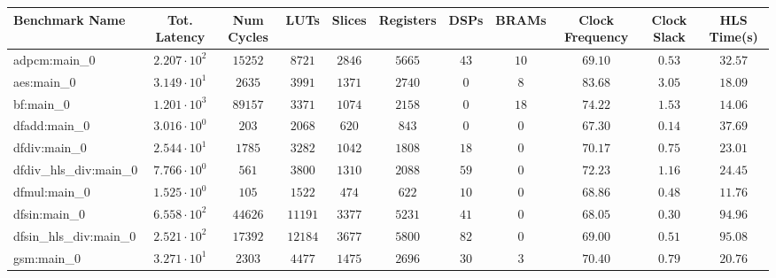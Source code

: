 \begin{tabular}{|l|c|c|c|c|c|c|c|c|c|c|}
\hline
Benchmark Name          & Tot. Latency           & Num Cycles & LUTs      & Slices    & Registers & DSPs    & BRAMs   & Clock Frequency & Clock Slack & HLS Time(s) \\
\hline
adpcm:main\_0           & $ 2.207 \cdot 10^{2} $ & $ 15252  $ & $ 8721  $ & $ 2846  $ & $ 5665  $ & $ 43  $ & $ 10  $ & $ 69.10       $ & $ 0.53    $ & $ 32.57   $ \\
aes:main\_0             & $ 3.149 \cdot 10^{1} $ & $ 2635   $ & $ 3991  $ & $ 1371  $ & $ 2740  $ & $ 0   $ & $ 8   $ & $ 83.68       $ & $ 3.05    $ & $ 18.09   $ \\
bf:main\_0              & $ 1.201 \cdot 10^{3} $ & $ 89157  $ & $ 3371  $ & $ 1074  $ & $ 2158  $ & $ 0   $ & $ 18  $ & $ 74.22       $ & $ 1.53    $ & $ 14.06   $ \\
dfadd:main\_0           & $ 3.016 \cdot 10^{0} $ & $ 203    $ & $ 2068  $ & $ 620   $ & $ 843   $ & $ 0   $ & $ 0   $ & $ 67.30       $ & $ 0.14    $ & $ 37.69   $ \\
dfdiv:main\_0           & $ 2.544 \cdot 10^{1} $ & $ 1785   $ & $ 3282  $ & $ 1042  $ & $ 1808  $ & $ 18  $ & $ 0   $ & $ 70.17       $ & $ 0.75    $ & $ 23.01   $ \\
dfdiv\_hls\_div:main\_0 & $ 7.766 \cdot 10^{0} $ & $ 561    $ & $ 3800  $ & $ 1310  $ & $ 2088  $ & $ 59  $ & $ 0   $ & $ 72.23       $ & $ 1.16    $ & $ 24.45   $ \\
dfmul:main\_0           & $ 1.525 \cdot 10^{0} $ & $ 105    $ & $ 1522  $ & $ 474   $ & $ 622   $ & $ 10  $ & $ 0   $ & $ 68.86       $ & $ 0.48    $ & $ 11.76   $ \\
dfsin:main\_0           & $ 6.558 \cdot 10^{2} $ & $ 44626  $ & $ 11191 $ & $ 3377  $ & $ 5231  $ & $ 41  $ & $ 0   $ & $ 68.05       $ & $ 0.30    $ & $ 94.96   $ \\
dfsin\_hls\_div:main\_0 & $ 2.521 \cdot 10^{2} $ & $ 17392  $ & $ 12184 $ & $ 3677  $ & $ 5800  $ & $ 82  $ & $ 0   $ & $ 69.00       $ & $ 0.51    $ & $ 95.08   $ \\
gsm:main\_0             & $ 3.271 \cdot 10^{1} $ & $ 2303   $ & $ 4477  $ & $ 1475  $ & $ 2696  $ & $ 30  $ & $ 3   $ & $ 70.40       $ & $ 0.79    $ & $ 20.76   $ \\

\end{tabular}
